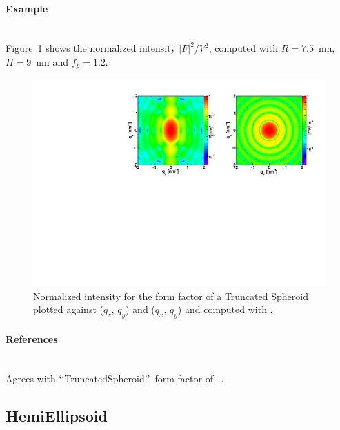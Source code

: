 \paragraph{Example}\strut\\
Figure~\ref{fig:FFspheroidEx} shows the normalized intensity
$|F|^2/V^2$, computed with $R=7.5$~nm, $H=9$~nm and $f_p=1.2$.

\begin{figure}[ht]
\begin{center}
\includegraphics[angle=-90,width=\textwidth]{fig/ff/figffspheroid.pdf}
\end{center}
\caption{Normalized intensity for the form factor of a Truncated Spheroid plotted against ($q_z$, $q_y$) and ($q_x$, $q_y$) and
  computed with .}
\label{fig:FFspheroidEx}
\end{figure}

\paragraph{References}\strut\\
Agrees with \lq\lq TruncatedSpheroid\rq\rq\ form factor
of \IsGISAXS~\cite{Laz02}.


\newpage
\subsection{HemiEllipsoid}   

